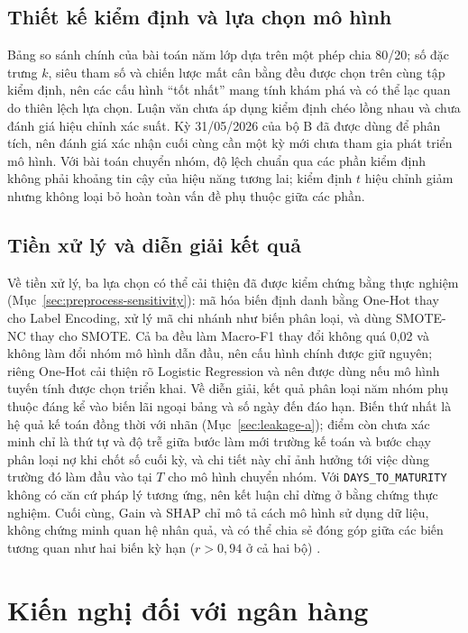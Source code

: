 \subsection{Thiết kế kiểm định và lựa chọn mô hình}

Bảng so sánh chính của bài toán năm lớp dựa trên một phép chia 80/20; số đặc trưng $k$, siêu tham số và chiến lược mất cân bằng đều được chọn trên cùng tập kiểm định, nên các cấu hình ``tốt nhất'' mang tính khám phá và có thể lạc quan do thiên lệch lựa chọn. Luận văn chưa áp dụng kiểm định chéo lồng nhau và chưa đánh giá hiệu chỉnh xác suất. Kỳ 31/05/2026 của bộ B đã được dùng để phân tích, nên đánh giá xác nhận cuối cùng cần một kỳ mới chưa tham gia phát triển mô hình. Với bài toán chuyển nhóm, độ lệch chuẩn qua các phần kiểm định không phải khoảng tin cậy của hiệu năng tương lai; kiểm định $t$ hiệu chỉnh giảm nhưng không loại bỏ hoàn toàn vấn đề phụ thuộc giữa các phần.

\subsection{Tiền xử lý và diễn giải kết quả}
\label{sec:limit-importance}

Về tiền xử lý, ba lựa chọn có thể cải thiện đã được kiểm chứng bằng thực nghiệm (Mục~\ref{sec:preprocess-sensitivity}): mã hóa biến định danh bằng One-Hot thay cho Label Encoding, xử lý mã chi nhánh như biến phân loại, và dùng SMOTE-NC thay cho SMOTE. Cả ba đều làm Macro-F1 thay đổi không quá 0,02 và không làm đổi nhóm mô hình dẫn đầu, nên cấu hình chính được giữ nguyên; riêng One-Hot cải thiện rõ Logistic Regression và nên được dùng nếu mô hình tuyến tính được chọn triển khai. Về diễn giải, kết quả phân loại năm nhóm phụ thuộc đáng kể vào biến lãi ngoại bảng và số ngày đến đáo hạn. Biến thứ nhất là hệ quả kế toán đồng thời với nhãn (Mục~\ref{sec:leakage-a}); điểm còn chưa xác minh chỉ là thứ tự và độ trễ giữa bước làm mới trường kế toán và bước chạy phân loại nợ khi chốt số cuối kỳ, và chi tiết này chỉ ảnh hưởng tới việc dùng trường đó làm đầu vào tại $T$ cho mô hình chuyển nhóm. Với \mbox{\texttt{DAYS\_TO\_MATURITY}} không có căn cứ pháp lý tương ứng, nên kết luận chỉ dừng ở bằng chứng thực nghiệm. Cuối cùng, Gain và SHAP chỉ mô tả cách mô hình sử dụng dữ liệu, không chứng minh quan hệ nhân quả, và có thể chia sẻ đóng góp giữa các biến tương quan như hai biến kỳ hạn ($r>0,94$ ở cả hai bộ) \cite{lundberg2017unified}.

\section{Kiến nghị đối với ngân hàng}

